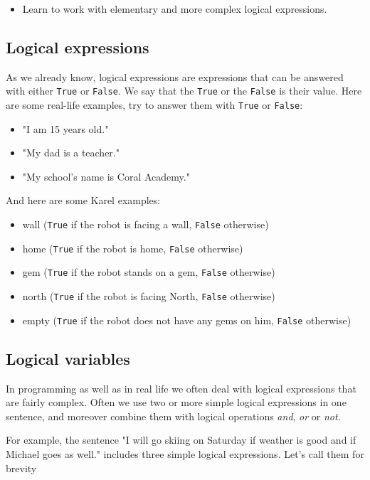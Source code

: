 \documentclass[article,A4,12pt]{llncs}
\begin{document}
\begin{itemize}
\item Learn to work with elementary and more complex logical expressions.
\end{itemize}

\subsection{Logical expressions}
As we already know, logical expressions are expressions that can be answered with either {\tt True} or 
{\tt False}. We say that the {\tt True} or the {\tt False} is their value. Here are some 
real-life examples, try to answer them with {\tt True} or {\tt False}:

\begin{itemize}
\item "I am 15 years old."
\item "My dad is a teacher."
\item "My school's name is Coral Academy."
\end{itemize}
And here are some Karel examples:
\begin{itemize}
\item wall ({\tt True} if the robot is facing a wall, {\tt False} otherwise)
\item home ({\tt True} if the robot is home, {\tt False} otherwise)
\item gem ({\tt True} if the robot stands on a gem, {\tt False} otherwise)
\item north ({\tt True} if the robot is facing North, {\tt False} otherwise)
\item empty ({\tt True} if the robot does not have any gems on him, {\tt False} otherwise)
\end{itemize}

\subsection{Logical variables}

In programming as well as in real life we often deal with logical expressions that are 
fairly complex. Often we use two or more simple logical expressions in one sentence, 
and moreover combine them with logical operations {\em and}, {\em or} or {\em not}.

For example, the sentence "I will go skiing on Saturday if weather is good and if 
Michael goes as well." includes three simple logical expressions. Let's call 
them for brevity\\
\end{document}
